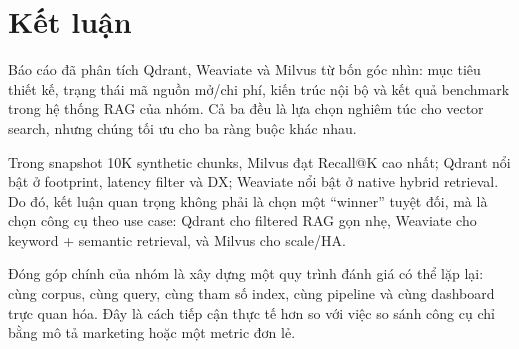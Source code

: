 \section{Kết luận}
\label{sec:conclusion}

Báo cáo đã phân tích Qdrant, Weaviate và Milvus từ bốn góc nhìn: mục tiêu thiết kế, trạng thái mã nguồn mở/chi phí, kiến trúc nội bộ và kết quả benchmark trong hệ thống RAG của nhóm. Cả ba đều là lựa chọn nghiêm túc cho vector search, nhưng chúng tối ưu cho ba ràng buộc khác nhau.

Trong snapshot 10K synthetic chunks, Milvus đạt Recall@K cao nhất; Qdrant nổi bật ở footprint, latency filter và DX; Weaviate nổi bật ở native hybrid retrieval. Do đó, kết luận quan trọng không phải là chọn một ``winner'' tuyệt đối, mà là chọn công cụ theo use case: Qdrant cho filtered RAG gọn nhẹ, Weaviate cho keyword + semantic retrieval, và Milvus cho scale/HA.

Đóng góp chính của nhóm là xây dựng một quy trình đánh giá có thể lặp lại: cùng corpus, cùng query, cùng tham số index, cùng pipeline và cùng dashboard trực quan hóa. Đây là cách tiếp cận thực tế hơn so với việc so sánh công cụ chỉ bằng mô tả marketing hoặc một metric đơn lẻ.
